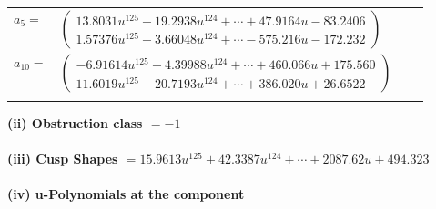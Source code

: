 \documentclass[1p]{elsarticle_modified}
\theoremstyle{definition}
\begin{document}
\begin{tabular}{m{7pt} m{180pt} m{7pt} m{180pt} }
\flushright $a_{5}=$&$\begin{pmatrix}13.8031 u^{125}+19.2938 u^{124}+\cdots+47.9164 u-83.2406\\1.57376 u^{125}-3.66048 u^{124}+\cdots-575.216 u-172.232\end{pmatrix}$ \\
\flushright $a_{10}=$&$\begin{pmatrix}-6.91614 u^{125}-4.39988 u^{124}+\cdots+460.066 u+175.560\\11.6019 u^{125}+20.7193 u^{124}+\cdots+386.020 u+26.6522\end{pmatrix}$\\&\end{tabular}
\flushleft \textbf{(ii) Obstruction class $= -1$}\\~\\
\flushleft \textbf{(iii) Cusp Shapes $= 15.9613 u^{125}+42.3387 u^{124}+\cdots+2087.62 u+494.323$}\\~\\
\newpage\renewcommand{\arraystretch}{1}
\flushleft \textbf{(iv) u-Polynomials at the component}\newline \\
\end{document}
